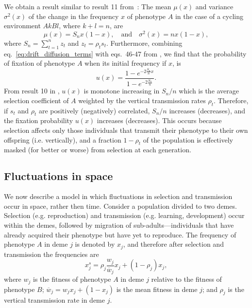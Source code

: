 \documentclass[14pt]{extarticle}
\begin{document}
We obtain a result similar to result 11 from~\citet{Ram2018}:
The mean $\mu(x)$ and variance $\sigma^2(x)$ of the change in the frequency $x$ of phenotype $A$ in the case of a cycling environment $AkBl$, where $k+l=n$, are
\begin{equation} \label{eq:drift_diffusion_terms}
\mu(x) = S_n x(1-x),
\quad \text{and} \quad
\sigma^2(x) = n x (1-x),
\end{equation}
where $S_n = \sum_{t=1}^{n}{z_t}$ and $z_t = \rho_t s_t$.
Furthermore, combining eq.~\ref{eq:drift_diffusion_terms} with eqs.~46-47 from \citet{Ram2018}, we find that the probability of fixation of phenotype $A$ when its initial frequency if $x$, is
\begin{equation}
u(x) = \frac{1 - e^{-2 \frac{S_n}{n} x}}{1 - e^{-2 \frac{S_n}{n}}}.
\end{equation}
From result 10 in \citet{Ram2018}, $u(x)$ is monotone increasing in $S_n/n$ which is the average selection coefficient of $A$ weighted by the vertical transmission rates $\rho_t$.
Therefore, if $s_t$ and $\rho_t$ are positively (negatively) correlated, $S_n/n$ increases (decreases), and the fixation probability $u(x)$ increases (decreases). 
This occurs because selection  affects only those individuals that transmit their phenotype to their own offspring (i.e. vertically), and a fraction $1-\rho_t$ of the population is effectively masked (for better or worse) from selection at each generation.

\subsection*{Fluctuations in space}

We now describe a model in which fluctuations in selection and transmission occur in space, rather then time.
Consider a population divided to two demes.
Selection (e.g. reproduction) and transmission (e.g. learning, development) occur within the demes, followed by migration of sub-adults---individuals that have already acquired their phenotype but have yet to reproduce. 
The frequency of phenotype $A$ in deme $j$ is denoted by $x_j$, and therefore after selection and transmission the frequencies are 
\begin{equation} \label{eq:migration_model_selection_transmission}
x_j^s = \rho_j \frac{w_j}{\overline{w}_j} x_j + (1-\rho_j) x_j,
\end{equation}
where $w_j$ is the fitness of phenotype $A$ in deme $j$ relative to the fitness of phenotype $B$; $\overline{w}_j=w_j x_j + (1-x_j)$ is the mean fitness in deme $j$; and $\rho_j$ is the vertical transmission rate in deme $j$.
\end{document}
